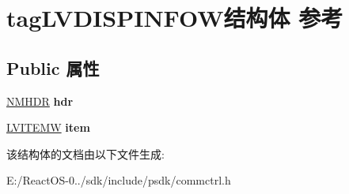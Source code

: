 \hypertarget{structtag_l_v_d_i_s_p_i_n_f_o_w}{}\section{tag\+L\+V\+D\+I\+S\+P\+I\+N\+F\+O\+W结构体 参考}
\label{structtag_l_v_d_i_s_p_i_n_f_o_w}
\subsection*{Public 属性}
\begin{DoxyCompactItemize}
\item 
\mbox{\label{structtag_l_v_d_i_s_p_i_n_f_o_w_aa837f4b3113afff13206c0a6a548fc0c}} 
\hyperlink{structtag_n_m_h_d_r}{N\+M\+H\+DR} {\bfseries hdr}
\item 
\mbox{\label{structtag_l_v_d_i_s_p_i_n_f_o_w_a1b5e62c03d29586638e445849ee12ca0}} 
\hyperlink{structtag_l_v_i_t_e_m_w}{L\+V\+I\+T\+E\+MW} {\bfseries item}
\end{DoxyCompactItemize}


该结构体的文档由以下文件生成\+:\begin{DoxyCompactItemize}
\item 
E\+:/\+React\+O\+S-\/0../sdk/include/psdk/commctrl.\+h\end{DoxyCompactItemize}
